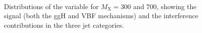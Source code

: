\begin{figure}[!htb]
\\
\caption{
    Distributions of the \mti variable for $M_\mathrm{X}=300$ and 700\GeV, showing the signal (both the ggH and VBF mechanisms) and the interference contributions in the three jet categories.}
    \label{fig:mti_int}
\end{figure}


